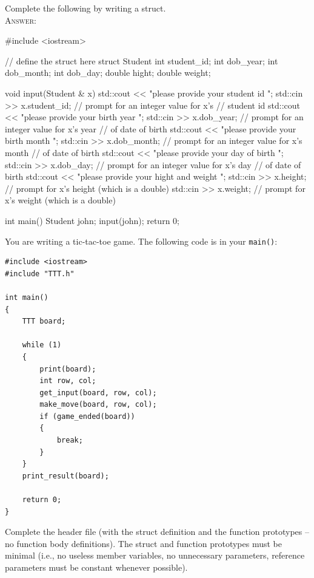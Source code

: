 \newpage
\nextq
Complete the following by writing a struct.
\\
\textsc{Answer:}\vspace{-2mm}
\begin{answercode}
#include <iostream>

// define the struct here
struct Student
{
        int student_id;
        int dob_year;
        int dob_month;
        int dob_day;
        double hight;
        double weight;
}



void input(Student & x)
{
    std::cout << "please provide your student id \n";   
    std::cin >> x.student_id; // prompt for an integer value for x's 
                              // student id
    std::cout << "please provide your birth year \n";                          
    std::cin >> x.dob_year;   // prompt for an integer value for x's year 
                              // of date of birth
    std::cout << "please provide your birth month \n";
    std::cin >> x.dob_month;  // prompt for an integer value for x's month 
                              // of date of birth
    std::cout << "please provide your day of birth \n";
    std::cin >> x.dob_day;    // prompt for an integer value for x's day 
                              // of date of birth
    std::cout << "please provide your hight and weight \n";
    std::cin >> x.height;     // prompt for x's height (which is a double)
    std::cin >> x.weight;     // prompt for x's weight (which is a double)
}

int main()
{
    Student john;
    input(john);
    return 0;
}
\end{answercode}

\newpage
\nextq
You are writing a tic-tac-toe game. The following code is in your
\verb!main()!:
\vspace{-3mm}
\begin{Verbatim}[frame=single,fontsize=\small]
#include <iostream>
#include "TTT.h"

int main()
{
    TTT board;

    while (1)
    {
        print(board);
        int row, col;
        get_input(board, row, col);
        make_move(board, row, col);
        if (game_ended(board)) 
        {
            break;
        }
    }
    print_result(board);

    return 0;
}
\end{Verbatim}
\vspace{-4mm}
Complete the header file (with the struct definition and the function
prototypes -- no function body definitions).
The struct and function prototypes must be minimal
(i.e., no useless member variables, no unnecessary parameters,
reference parameters must be constant whenever possible).

